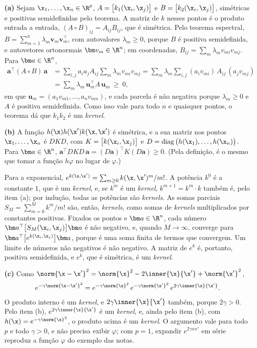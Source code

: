 \begin{solucao}
\textbf{(a)} Sejam $\x_1,\dots,\x_n\in\R^p$, $A=\big[k_1(\x_i,\x_j)\big]$ e
$B=\big[k_2(\x_i,\x_j)\big]$, simétricas e positivas semidefinidas pelo teorema. A matriz de
$k$ nesses pontos é o produto entrada a entrada, $(A\circ B)_{ij}=A_{ij}B_{ij}$, que é
simétrica. Pelo teorema espectral, $B=\sum_{m=1}^n\lambda_m\bm v_m\bm v_m^\top$, com
autovalores $\lambda_m\ge0$, porque $B$ é positiva semidefinida, e autovetores ortonormais
$\bm v_m\in\R^n$; em coordenadas, $B_{ij}=\sum_m\lambda_m v_{mi}v_{mj}$. Para $\bm a\in\R^n$,
\begin{align*}
  \bm a^\top(A\circ B)\,\bm a
  &=\sum_{i,j}a_ia_jA_{ij}\sum_m\lambda_mv_{mi}v_{mj}
   =\sum_m\lambda_m\sum_{i,j}(a_iv_{mi})\,A_{ij}\,(a_jv_{mj})\\
  &=\sum_m\lambda_m\,\bm u_m^\top A\,\bm u_m\ \ge\ 0,
\end{align*}
em que $\bm u_m=(a_1v_{m1},\dots,a_nv_{mn})$, e cada parcela é não negativa porque
$\lambda_m\ge0$ e $A$ é positiva semidefinida. Como isso vale para todo $n$ e quaisquer
pontos, o teorema dá que $k_1k_2$ é um \emph{kernel}.

\smallskip
\textbf{(b)} A função $h(\x)h(\x')k(\x,\x')$ é simétrica, e a sua matriz nos pontos
$\x_1,\dots,\x_n$ é $DKD$, com $K=\big[k(\x_i,\x_j)\big]$ e
$D=\operatorname{diag}\big(h(\x_1),\dots,h(\x_n)\big)$. Para $\bm a\in\R^n$,
$\bm a^\top DKD\,\bm a=(D\bm a)^\top K(D\bm a)\ge0$. (Pela definição, é o mesmo que tomar a
função $h\varphi$ no lugar de $\varphi$.)

Para a exponencial, $e^{k(\x,\x')}=\sum_{m\ge0}k(\x,\x')^m/m!$. A potência $k^0$ é a
constante $1$, que é um \emph{kernel}, e, se $k^m$ é um \emph{kernel}, $k^{m+1}=k^m\cdot k$
também é, pelo item (a); por indução, todas as potências são \emph{kernels}. As somas
parciais $S_M=\sum_{m=0}^Mk^m/m!$ são, então, \emph{kernels}, como somas de \emph{kernels}
multiplicados por constantes positivas. Fixados os pontos e $\bm a\in\R^n$, cada número
$\bm a^\top\big[S_M(\x_i,\x_j)\big]\bm a$ é não negativo, e, quando $M\to\infty$, converge para
$\bm a^\top\big[e^{k(\x_i,\x_j)}\big]\bm a$, porque é uma soma finita de termos que convergem.
Um limite de números não negativos é não negativo. A matriz de $e^k$ é, portanto, positiva
semidefinida, e $e^k$, que é simétrica, é um \emph{kernel}.

\smallskip
\textbf{(c)} Como $\norm{\x-\x'}^2=\norm{\x}^2-2\inner{\x}{\x'}+\norm{\x'}^2$,
\[
  e^{-\gamma\norm{\x-\x'}^2}
  =e^{-\gamma\norm{\x}^2}\,e^{-\gamma\norm{\x'}^2}\,e^{2\gamma\inner{\x}{\x'}} .
\]
O produto interno é um \emph{kernel}, e $2\gamma\inner{\x}{\x'}$ também, porque $2\gamma>0$.
Pelo item (b), $e^{2\gamma\inner{\x}{\x'}}$ é um \emph{kernel}, e, ainda pelo item (b), com
$h(\x)=e^{-\gamma\norm{\x}^2}$, o produto acima é um \emph{kernel}. O argumento vale para todo
$p$ e todo $\gamma>0$, e não precisa exibir $\varphi$; com $p=1$, expandir
$e^{2\gamma xx'}$ em série reproduz a função $\varphi$ do exemplo das notas.


\end{solucao}
